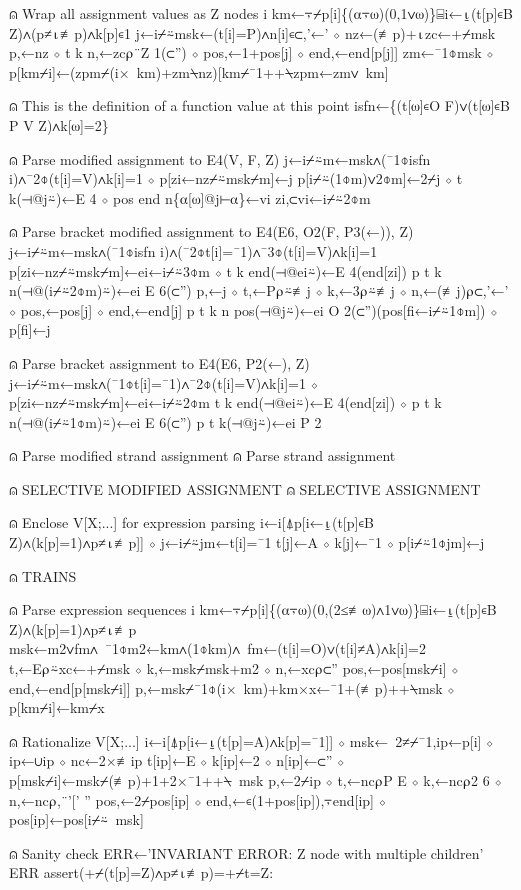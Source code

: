 \documentclass{article}%
\begin{document}
⍝ Wrap all assignment values as Z nodes
         i km←⍪⌿p[i]\{(⍺⍪⍵)(0,1∨⍵)\}⌸i←⍸(t[p]∊B Z)∧(p≠⍳≢p)∧k[p]∊1
         j←i⌿⍨msk←(t[i]=P)∧n[i]∊⊂,'←' ⋄ nz←(≢p)+⍳zc←+⌿msk
         p,←nz ⋄ t k n,←zc⍴¨Z 1(⊂'') ⋄ pos,←1+pos[j] ⋄ end,←end[p[j]]
         zm←¯1⌽msk ⋄ p[km⌿i]←(zpm⌿(i×~km)+zm⍀nz)[km⌿¯1++⍀zpm←zm∨~km]

⍝ This is the definition of a function value at this point
         isfn←\{(t[⍵]∊O F)∨(t[⍵]∊B P V Z)∧k[⍵]=2\}

⍝ Parse modified assignment to E4(V, F, Z)
         j←i⌿⍨m←msk∧(¯1⌽isfn i)∧¯2⌽(t[i]=V)∧k[i]=1 ⋄ p[zi←nz⌿⍨msk⌿m]←j
         p[i⌿⍨(1⌽m)∨2⌽m]←2⌿j ⋄ t k(⊣@j⍨)←E 4 ⋄ pos end n\{⍺[⍵]@j⊢⍺\}←vi zi,⊂vi←i⌿⍨2⌽m

⍝ Parse bracket modified assignment to E4(E6, O2(F, P3(←)), Z)
         j←i⌿⍨m←msk∧(¯1⌽isfn i)∧(¯2⌽t[i]=¯1)∧¯3⌽(t[i]=V)∧k[i]=1
         p[zi←nz⌿⍨msk⌿m]←ei←i⌿⍨3⌽m ⋄ t k end(⊣@ei⍨)←E 4(end[zi])
         p t k n(⊣@(i⌿⍨2⌽m)⍨)←ei E 6(⊂'')
         p,←j ⋄ t,←P⍴⍨≢j ⋄ k,←3⍴⍨≢j ⋄ n,←(≢j)⍴⊂,'←' ⋄ pos,←pos[j] ⋄ end,←end[j]
         p t k n pos(⊣@j⍨)←ei O 2(⊂'')(pos[fi←i⌿⍨1⌽m]) ⋄ p[fi]←j

⍝ Parse bracket assignment to E4(E6, P2(←), Z)
         j←i⌿⍨m←msk∧(¯1⌽t[i]=¯1)∧¯2⌽(t[i]=V)∧k[i]=1 ⋄ p[zi←nz⌿⍨msk⌿m]←ei←i⌿⍨2⌽m
         t k end(⊣@ei⍨)←E 4(end[zi]) ⋄ p t k n(⊣@(i⌿⍨1⌽m)⍨)←ei E 6(⊂'')
         p t k(⊣@j⍨)←ei P 2

⍝ Parse modified strand assignment
⍝ Parse strand assignment

⍝ SELECTIVE MODIFIED ASSIGNMENT
⍝ SELECTIVE ASSIGNMENT

⍝ Enclose V[X;...] for expression parsing
         i←i[⍋p[i←⍸(t[p]∊B Z)∧(k[p]=1)∧p≠⍳≢p]] ⋄ j←i⌿⍨jm←t[i]=¯1
         t[j]←A ⋄ k[j]←¯1 ⋄ p[i⌿⍨1⌽jm]←j

⍝ TRAINS

⍝ Parse expression sequences
         i km←⍪⌿p[i]\{(⍺⍪⍵)(0,(2≤≢⍵)∧1∨⍵)\}⌸i←⍸(t[p]∊B Z)∧(k[p]=1)∧p≠⍳≢p
         msk←m2∨fm∧~¯1⌽m2←km∧(1⌽km)∧~fm←(t[i]=O)∨(t[i]≠A)∧k[i]=2
         t,←E⍴⍨xc←+⌿msk ⋄ k,←msk⌿msk+m2 ⋄ n,←xc⍴⊂''
         pos,←pos[msk⌿i] ⋄ end,←end[p[msk⌿i]]
         p,←msk⌿¯1⌽(i×~km)+km×x←¯1+(≢p)++⍀msk ⋄ p[km⌿i]←km⌿x

⍝ Rationalize V[X;...]
         i←i[⍋p[i←⍸(t[p]=A)∧k[p]=¯1]] ⋄ msk←~2≠⌿¯1,ip←p[i] ⋄ ip←∪ip ⋄ nc←2×≢ip
         t[ip]←E ⋄ k[ip]←2 ⋄ n[ip]←⊂'' ⋄ p[msk⌿i]←msk⌿(≢p)+1+2×¯1++⍀~msk
         p,←2⌿ip ⋄ t,←nc⍴P E ⋄ k,←nc⍴2 6 ⋄ n,←nc⍴,¨'[' ''
         pos,←2⌿pos[ip] ⋄ end,←∊(1+pos[ip]),⍪end[ip] ⋄ pos[ip]←pos[i⌿⍨~msk]

⍝ Sanity check
         ERR←'INVARIANT ERROR: Z node with multiple children'
         ERR assert(+⌿(t[p]=Z)∧p≠⍳≢p)=+⌿t=Z:
\end{document}
